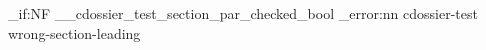 \documentclass{careerdossier-resume}
\begin{document}
\ExplSyntaxOn
\bool_if:NF \g__cdossier_test_section_par_checked_bool
  { \msg_error:nn { cdossier-test } { wrong-section-leading } }
\ExplSyntaxOff
\end{document}
